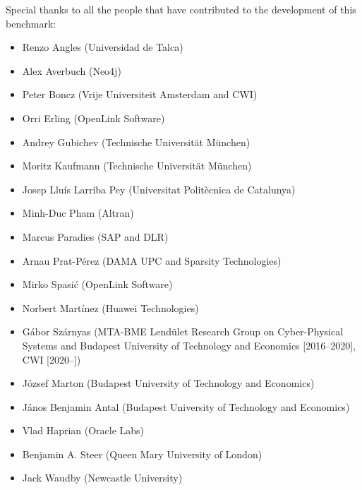 Special thanks to all the people that have contributed to the development of this benchmark:
\begin{itemize}
  \item Renzo Angles (Universidad de Talca)
  \item Alex Averbuch (Neo4j)
  \item Peter Boncz (Vrije Universiteit Amsterdam and CWI)
  \item Orri Erling (OpenLink Software)
  \item Andrey Gubichev (Technische Universit\"at M\"unchen)
  \item Moritz Kaufmann (Technische Universit\"at M\"unchen)
  \item Josep Llu\'is Larriba Pey (Universitat Polit\`ecnica de Catalunya)
  \item Minh-Duc Pham (Altran)
  \item Marcus Paradies (SAP and DLR)
  \item Arnau Prat-P\'erez (DAMA UPC and Sparsity Technologies)
  \item Mirko Spasi\'c (OpenLink Software)
  \item Norbert Mart\'inez (Huawei Technologies)
  \item G\'abor Sz\'arnyas (MTA-BME Lend\"ulet Research Group on Cyber-Physical Systems and Budapest University of Technology and Economics [2016--2020], CWI [2020--])
  \item J\'ozsef Marton (Budapest University of Technology and Economics)
  \item J\'anos Benjamin Antal (Budapest University of Technology and Economics)
  \item Vlad Haprian (Oracle Labs)
  \item Benjamin A. Steer (Queen Mary University of London)
  \item Jack Waudby (Newcastle University)
\end{itemize}
